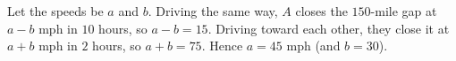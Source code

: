 Let the speeds be $a$ and $b$. Driving the same way, $A$ closes the $150$-mile gap at $a-b$ mph in $10$ hours, so $a-b=15$. Driving toward each other, they close it at $a+b$ mph in $2$ hours, so $a+b=75$. Hence $a=\boxed{45}$ mph (and $b=30$).
